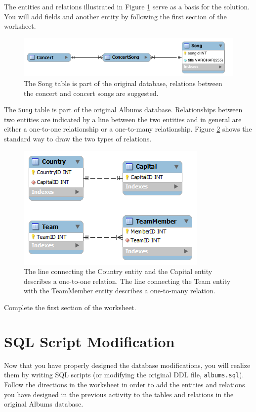 \documentclass[12pt]{scrartcl}
\begin{document}
The entities and relations illustrated in Figure \ref{figure:hint} serve as a 
basis for the solution. You will add fields and another entity 
by following the first section of the worksheet.
 
\begin{figure}[h]
\centering
\includegraphics[scale=.50]{images/hint}
\caption{The Song table is part of the original database, relations
between the concert and concert songs are suggested.}
\label{figure:hint}
\end{figure}

The \texttt{Song} table is part of the original Albums 
database. Relationships between two entities are indicated by a 
line between the two entities and in general are either a 
one-to-one relationship or a one-to-many relationship.  Figure \ref{figure:example} shows the standard way to draw the two types 
of relations.
 
\begin{figure}[h]
\centering
\includegraphics[scale=.50]{images/Example}
\caption{The line connecting the Country entity and the Capital entity describes a one-to-one relation. The line connecting the Team entity with the TeamMember entity describes a one-to-many relation.}
\label{figure:example}
\end{figure}

Complete the first section of the worksheet. 

\section*{SQL Script Modification}

Now that you have properly designed the database modifications, 
you will realize them by writing SQL scripts (or modifying the 
original DDL file, \texttt{albums.sql}).  Follow the directions in the 
worksheet in order to add the entities and relations you have 
designed in the previous activity to the tables and relations 
in the original Albums database.
\end{document}
